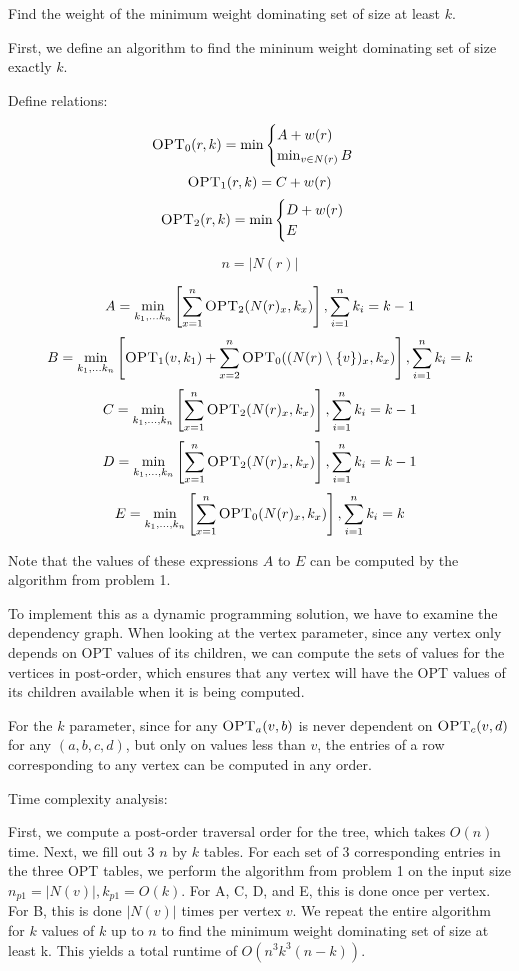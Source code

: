 \documentclass{article}
\begin{document}
Find the weight of the minimum weight dominating set of size at least $k$.

First, we define an algorithm to find the mininum weight dominating set of
size exactly $k$.

Define relations:

$$\textsc{OPT}_0(r, k) = \min 
\begin{cases} 
    A + w(r) \\
    \min_{v \in N(r)} B
\end{cases}$$
$$\textsc{OPT}_1(r, k) = C + w(r)$$
$$\textsc{OPT}_2(r, k) = \min
\begin{cases}
    D + w(r) \\
    E
\end{cases}$$

$$n = |N(r)|$$

$$A = \min_{k_1,...k_n} \left[\sum_{x = 1}^n \textsc{OPT}_2(N(r)_x, k_x) \right], \sum_{i=1}^n
k_i = k - 1$$
$$B = \min_{k_1,...k_n} \left[\textsc{OPT}_1(v,k_1) + \sum_{x = 2}^n
\textsc{OPT}_0((N(r) \setminus \{v\})_x, k_x) \right], \sum_{i=1}^n
k_i = k$$
$$C = \min_{k_1,...,k_n} \left[ \sum_{x=1}^n \textsc{OPT}_2(N(r)_x,k_x)\right], \sum_{i=1}^n
k_i = k - 1$$
$$D = \min_{k_1,...,k_n} \left[\sum_{x=1}^n \textsc{OPT}_2(N(r)_x, k_x)\right], \sum_{i=1}^n
k_i = k - 1 $$
$$E = \min_{k_1,...,k_n} \left[\sum_{x=1}^n \textsc{OPT}_0(N(r)_x, k_x)\right], \sum_{i=1}^n
k_i = k$$

Note that the values of these expressions $A$ to $E$ can be computed by the
algorithm from problem 1.

To implement this as a dynamic programming solution, we have to examine the
dependency graph. When looking at the vertex parameter, since any vertex only
depends on \textsc{OPT} values of its children, we can compute the
sets of values for the vertices in post-order, which ensures that any vertex
will have the \textsc{OPT} values of its children available when it is being
computed.

For the $k$ parameter, since for any $\textsc{OPT}_a(v,b)$ is never dependent
on $\textsc{OPT}_c(v,d)$ for any $(a,b,c,d)$, but only on values less than
$v$, the entries of a row corresponding to any vertex can be computed in any
order. 



Time complexity analysis:

First, we compute a post-order traversal order for the tree, which takes
$O(n)$ time. Next, we fill out 3 $n$ by $k$ tables. For each set of 3
corresponding entries in the three \textsc{OPT} tables, we perform the
algorithm from problem 1 on the input size $n_{p1} = |N(v)|, k_{p1} = O(k)$.
For A, C, D, and E, this is done once per vertex. For B, this is done $|N(v)|$
times per vertex $v$. We repeat the entire algorithm for $k$ values of $k$ up
to $n$ to find the minimum weight dominating set of size at least k. This
yields a total runtime of $O(n^3k^3(n-k))$.
\end{document}
